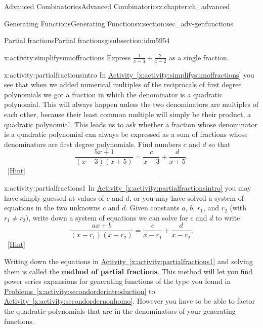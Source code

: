 \documentclass[oneside,10pt,]{book}
\newcommand{\terminology}[1]{\textbf{#1}}
\numberwithin{equation}{chapter}
\begin{document}
\begin{chapterptx}{Advanced Combinatorics}{}{Advanced Combinatorics}{}{}{x:chapter:ch_advanced}
\begin{sectionptx}{Generating Functions}{}{Generating Functions}{}{}{x:section:sec_adv-genfunctions}
\begin{subsectionptx}{Partial fractions}{}{Partial fractions}{}{}{g:subsection:idm5954}
\begin{activity}{}{x:activity:simplifysumoffractions}%
Express \(\frac{1}{x-3} + \frac{2}{x-2}\) as a single fraction.%
\end{activity}
\begin{activity}{}{x:activity:partialfractionsintro}%
In \hyperref[x:activity:simplifysumoffractions]{Activity~\ref{x:activity:simplifysumoffractions}} you see that when we added numerical multiples of the reciprocals of first degree polynomials we got a fraction in which the denominator is a quadratic polynomial. This will always happen unless the two denominators are multiples of each other, because their least common multiple will simply be their product, a quadratic polynomial. This leads us to ask whether a fraction whose denominator is a quadratic polynomial can always be expressed as a sum of fractions whose denominators are first degree polynomials. Find numbers \(c\) and \(d\) so that%
\begin{equation*}
\frac{5x+1}{(x-3)(x+5)} = \frac{c}{x-3} + \frac{d}{x+5}.
\end{equation*}
%
\qquad~\hfill{\tiny\hyperlink{g:hint:idm5971-back}{[Hint]}}\end{activity}
\begin{activity}{}{x:activity:partialfractions1}%
In \hyperref[x:activity:partialfractionsintro]{Activity~\ref{x:activity:partialfractionsintro}} you may have simply guessed at values of \(c\) and \(d\), or you may have solved a system of equations in the two unknowns \(c\) and \(d\). Given constants \(a\), \(b\), \(r_1\), and \(r_2\) (with \(r_1\not= r_2\)), write down a system of equations we can solve for \(c\) and \(d\) to write%
\begin{equation*}
\frac{ax+b}{(x-r_1)(x-r_2)} = \frac{c}{x-r_1} + \frac{d}{x-r_2}\text{.}
\end{equation*}
%
\qquad~\hfill{\tiny\hyperlink{g:hint:idm6006-back}{[Hint]}}\end{activity}
Writing down the equations in \hyperref[x:activity:partialfractions1]{Activity~\ref{x:activity:partialfractions1}} and solving them is called the \terminology{method of partial fractions}. This method will let you find power series expansions for generating functions of the type you found in \hyperref[x:activity:secondorderintroduction]{Problems~\ref{x:activity:secondorderintroduction}} to \hyperref[x:activity:secondordernonhomo]{Activity~\ref{x:activity:secondordernonhomo}}. However you have to be able to factor the quadratic polynomials that are in the denominators of your generating functions.%

\end{subsectionptx}
\end{sectionptx}
\end{chapterptx}
\end{document}
